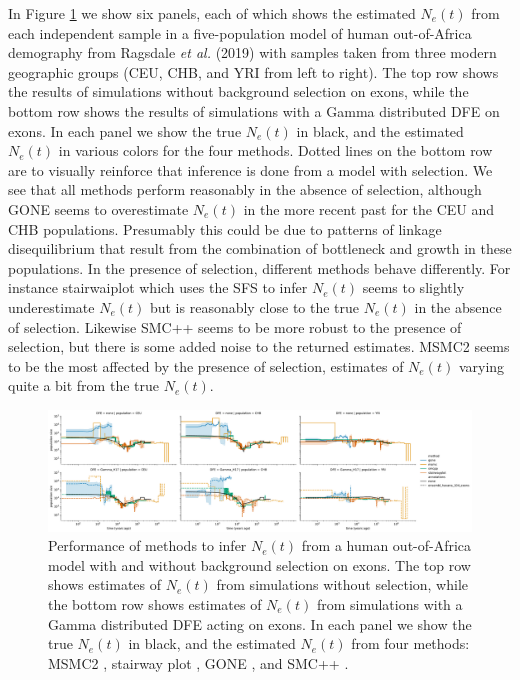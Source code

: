 \documentclass[hidelinks]{article}
\begin{document}
In Figure \ref{fig:1pop-human-demography} we show six panels, each of which shows the estimated $N_e(t)$
from each independent sample in a five-population model of human out-of-Africa demography
from Ragsdale \textit{et al.} (2019)
with samples taken from three modern geographic groups (CEU, CHB, and YRI from left to right).
The top row shows the results of simulations without background selection on exons, while the bottom row shows the results
of simulations with a Gamma distributed DFE on exons. In each panel we show the true $N_e(t)$ in black, and the estimated $N_e(t)$
in various colors for the four methods. Dotted lines on the bottom row are to visually reinforce that inference is done
from a model with selection.  We see that all methods perform reasonably in the absence of selection, 
although GONE seems to overestimate $N_e(t)$ in the more recent past for the CEU and CHB populations.
Presumably this could be due to patterns of linkage disequilibrium that result from the combination
of bottleneck and growth in these populations.
In the presence of selection, different methods behave differently. 
For instance stairwaiplot which uses the SFS to infer $N_e(t)$ seems to slightly underestimate $N_e(t)$
but is reasonably close to the true $N_e(t)$ in the absence of selection.
Likewise SMC++ seems to be more robust to the presence of selection,
but there is some added noise to the returned estimates. 
MSMC2 seems to be the most affected by the presence of selection, 
estimates of $N_e(t)$ varying quite a bit from the true $N_e(t)$.



\begin{figure}[t]
    \centering
    \includegraphics[width=\textwidth]{figures/HomSap/estimated_Ne_t_final}
    \caption{
    \label{fig:1pop-human-demography}
    Performance of methods to infer $N_e(t)$ from a human out-of-Africa model \citep{ragsdale2019models}
    with and without background selection on exons. The top row shows estimates of $N_e(t)$ from simulations
    without selection, while the bottom row shows estimates of $N_e(t)$ from simulations with a Gamma distributed   
    DFE acting on exons. In each panel we show the true $N_e(t)$ in black, and the estimated $N_e(t)$ from four methods:    
    MSMC2 \citep{Schiffels2020}, stairway plot \citep{liu2020stairway}, GONE \citep{santiago2020recent}, and SMC++ \citep{terhorst2017robust}.  
    }
\end{figure}
\end{document}
